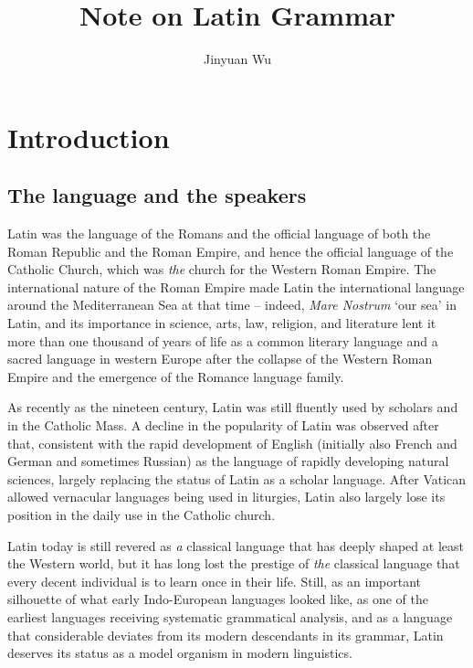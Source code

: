 \documentclass[a4paper, oneside, 12pt]{report}
\title{Note on Latin Grammar}
\author{Jinyuan Wu}
\newcommand{\form}[1]{\emph{#1}}
\newcommand{\translate}[1]{`#1'}
\begin{document}
\automath

\maketitle

\chapter{Introduction}

\section{The language and the speakers}

Latin was the language of the Romans
and the official language of both the Roman Republic and the Roman Empire,
and hence the official language of the Catholic Church, 
which was \emph{the} church for the Western Roman Empire. 
The international nature of the Roman Empire made Latin 
the international language around the Mediterranean Sea at that time -- 
indeed, \form{Mare Nostrum} \translate{our sea} in Latin,
and its importance in science, arts, law, religion, and literature 
lent it more than one thousand of years of life 
as a common literary language and a sacred language in western Europe
after the collapse of the Western Roman Empire 
and the emergence of the Romance language family.

As recently as the nineteen century,
Latin was still fluently used by scholars and in the Catholic Mass. 
A decline in the popularity of Latin was observed after that,
consistent with the rapid development of English
(initially also French and German and sometimes Russian)
as the language of rapidly developing natural sciences,
largely replacing the status of Latin as a scholar language.
After Vatican allowed vernacular languages being used in liturgies, 
Latin also largely lose its position in the daily use in the Catholic church. 

Latin today is still revered as \emph{a} classical language
that has deeply shaped at least the Western world,
but it has long lost the prestige of \emph{the} classical language
that every decent individual is to learn once in their life.
Still, as an important silhouette of what early Indo-European languages looked like,
as one of the earliest languages receiving systematic grammatical analysis,
and as a language that considerable deviates from its modern descendants in its grammar,
Latin deserves its status as a model organism in modern linguistics.
\end{document}

